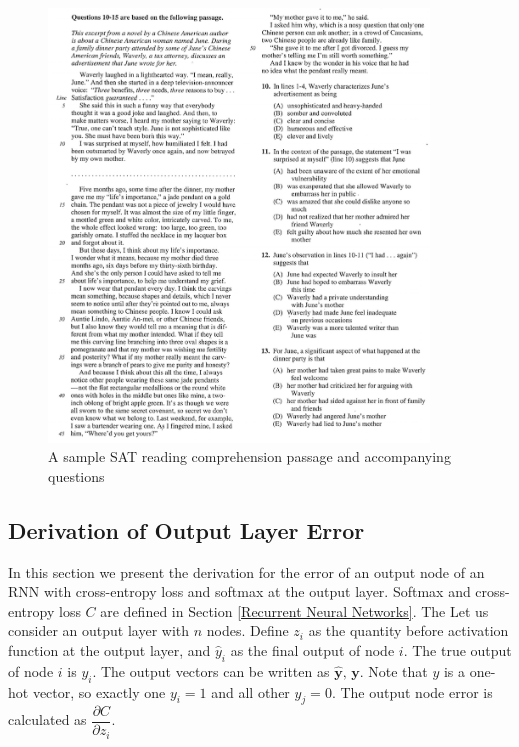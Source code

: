 \documentclass[pageno]{final_paper}
\begin{document}
\begin{figure}[b]
    \centering
    \includegraphics[width=0.9\textwidth,keepaspectratio]{figures/SAT_Example.png}
    \caption{A sample SAT reading comprehension passage and accompanying questions}
    \label{fig: SAT Example}
\end{figure}

\newpage
\subsection{Derivation of Output Layer Error}
\label{Derivation of Output Layer Error}

In this section we present the derivation for the error of an output node of an
RNN with cross-entropy loss and softmax at the output layer. Softmax and
cross-entropy loss $C$ are defined in Section \ref{Recurrent Neural Networks}.
The Let us consider an output layer with $n$ nodes. Define $z_i$ as the quantity
before activation function at the output layer, and $\hat{y}_i$ as the final
output of node $i$. The true output of node $i$ is $y_i$. The output vectors can
be written as $\mathbf{\hat{y}},\,\mathbf{y}$. Note that $y$ is a one-hot
vector, so exactly one $y_i = 1$ and all other $y_j = 0$. The output node error
is calculated as $\dfrac{\partial C}{\partial z_i}$.
\end{document}
